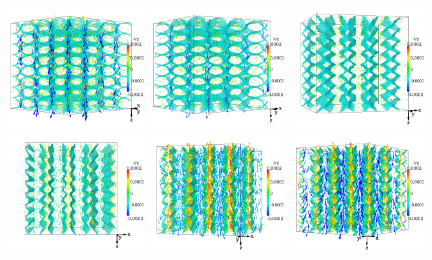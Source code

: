 \documentclass[8.5pt,twoside,twocolumn]{article}
\begin{document}
\begin{figure}[htpb]
\includegraphics[width=0.32\textwidth]{v_yz-v_z-364k_run914r.png}
\includegraphics[width=0.32\textwidth]{v_yz-v_z-366k_run914r.png}
\includegraphics[width=0.32\textwidth]{v_yz-v_z-368k_run914r.png}
\includegraphics[width=0.32\textwidth]{v_yz-v_z-370k_run914r.png}
\includegraphics[width=0.32\textwidth]{v_yz-v_z-372k_run914r.png}
\includegraphics[width=0.32\textwidth]{v_yz-v_z-374k_run914r.png}

\end{figure}
\end{document}
